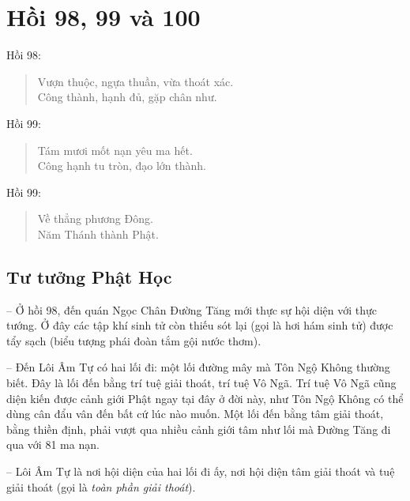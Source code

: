 \chapter{Hồi 98, 99 và 100} %
\label{cha:hoi_98_99_100}

Hồi 98:

\begin{verse}
\begin{itshape}
Vượn thuộc, ngựa thuần, vừa thoát xác.\\
Công thành, hạnh đủ, gặp chân như.
\end{itshape}
\end{verse}

Hồi 99:

\begin{verse}
\begin{itshape}
Tám mươi mốt nạn yêu ma hết.\\
Công hạnh tu tròn, đạo lớn thành.
\end{itshape}
\end{verse}

Hồi 99:

\begin{verse}
\begin{itshape}
Về thẳng phương Đông.\\
Năm Thánh thành Phật.
\end{itshape}
\end{verse}

\section{Tư tưởng Phật Học} %
\label{sec:98_99_100_phat_hoc}

-- Ở hồi 98, đến quán Ngọc Chân Đường Tăng mới thực sự hội diện với thực tướng. Ở đây các tập khí sinh tử còn thiếu sót lại (gọi là hơi hám sinh tử) được tẩy sạch (biểu tượng phái đoàn tắm gội nước thơm).

-- Đến Lôi Âm Tự có hai lối đi: một lối đường mây mà Tôn Ngộ Không thường biết. Đây là lối đến bằng trí tuệ giải thoát, trí tuệ Vô Ngã. Trí tuệ Vô Ngã cũng diện kiến được cảnh giới Phật ngay tại đây ở đời này, như Tôn Ngộ Không có thể dùng cân đẩu vân đến bất cứ lúc nào muốn. Một lối đến bằng tâm giải thoát, bằng thiền định, phải vượt qua nhiều cảnh giới tâm như lối mà Đường Tăng đi qua với 81 ma nạn.

-- Lôi Âm Tự là nơi hội diện của hai lối đi ấy, nơi hội diện tâm giải thoát và tuệ giải thoát (gọi là \emph{toàn phần giải thoát}).

